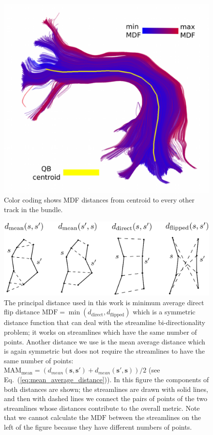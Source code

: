 \documentclass{bioinfo}
\begin{document}
\begin{methods}
\begin{figure}
\includegraphics[scale=0.15]{Figures/Fig_11_MDF_arcuate}
\centering{}
\caption{Color coding shows MDF distances from centroid to every other track in the bundle.\label{Flo:MDF_arcuate}}
\end{figure}

\begin{figure}
\includegraphics[scale=0.35]{Figures/Fig_2_distances2}
\centering{}
\caption{The principal distance used in this work is minimum average
  direct flip distance
  $\textrm{MDF}=\min(d_{\textrm{direct}},d_{\textrm{flipped}})$ which is
  a symmetric distance function that can deal with the streamline
  bi-directionality problem; it works on streamlines which have the same
  number of points.  Another distance we use is the mean average
  distance which is again symmetric but does not require the streamlines
  to have the same number of points: $\textrm{MAM}_{\textrm{mean}} =
  (d_{mean}(\mathbf{s}, \mathbf{s'}) + d_{mean}(\mathbf{s'},
  \mathbf{s}))/2$ (see Eq.~(\ref{eq:mean_average_distance})).  In this
  figure the components of both distances are shown; the streamlines are
  drawn with solid lines, and then with dashed lines we connect the
  pairs of points of the two streamlines whose distances contribute to
  the overall metric. Note that we cannot calculate the $\textrm{MDF}$
  between the streamlines on the left of the figure because they have
  different numbers of points.
  \label{Flo:Distances_used}}
\end{figure}


\end{methods}
\end{document}

